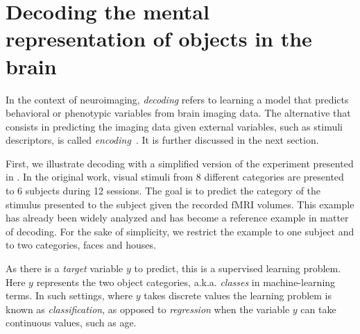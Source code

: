 \documentclass{frontiersSCNS} %
\begin{document}



\section{Decoding the mental representation of objects in the brain}

In the context of neuroimaging, \textit{decoding} refers to learning a model
that predicts behavioral or phenotypic variables from brain imaging data. 
The alternative that consists in predicting the imaging data given external
variables, such as stimuli descriptors, is 
called \textit{encoding}~\citep{naselaris2011}. It is further discussed in the next 
section.

First, we illustrate decoding with a simplified version of the experiment presented in
\cite{haxby2001}. In the original work, visual stimuli from 8 different categories
are presented to 6 subjects during 12 sessions. The goal is to 
predict the category of the stimulus presented to the subject given the
recorded fMRI volumes. This example has already been widely analyzed
\citep{hanson2004combinatorial,detre2006multi,otoole2007,hanson2008brain,hanke2009pymvpa} and has become a reference
example in matter of decoding. For the sake of simplicity, we restrict the example
to one subject and to two categories, faces and houses.

As there is a \emph{target} variable $y$ to predict, this is a supervised
learning problem. Here $y$ represents the two object categories, a.k.a.
\emph{classes} in machine-learning terms. In such settings, where $y$
takes discrete values the learning
problem is known as \emph{classification}, as opposed to
\emph{regression} when the variable $y$ can take continuous values,
such as age.
\end{document}
